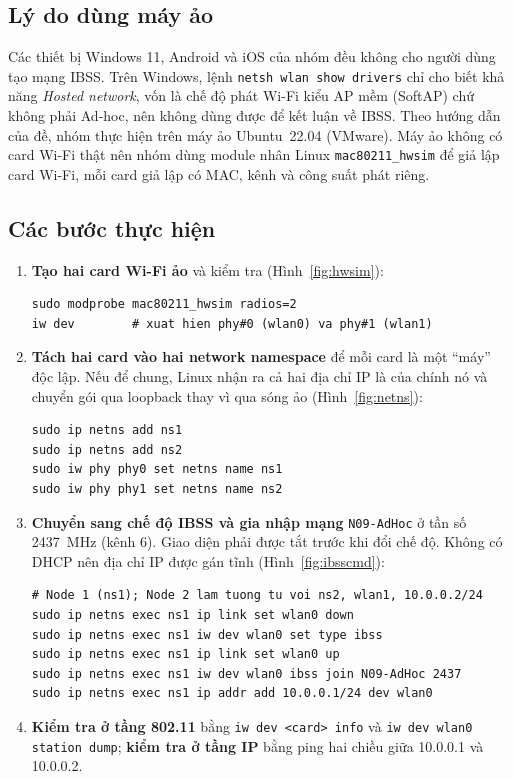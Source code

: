 \documentclass[12pt,a4paper]{article}
\numberwithin{figure}{section}
\numberwithin{table}{section}
\newcommand{\mono}[1]{\texttt{#1}}
\begin{document}
\subsection{Lý do dùng máy ảo}
Các thiết bị Windows 11, Android và iOS của nhóm đều không cho người dùng tạo
mạng IBSS. Trên Windows, lệnh \mono{netsh wlan show drivers} chỉ cho biết khả
năng \emph{Hosted network}, vốn là chế độ phát Wi-Fi kiểu AP mềm (SoftAP) chứ
không phải Ad-hoc, nên không dùng được để kết luận về IBSS. Theo hướng dẫn
của đề, nhóm thực hiện trên máy ảo Ubuntu~22.04 (VMware). Máy ảo không có card
Wi-Fi thật nên nhóm dùng module nhân Linux \mono{mac80211\_hwsim} để giả lập
card Wi-Fi, mỗi card giả lập có MAC, kênh và công suất phát riêng.

\subsection{Các bước thực hiện}
\begin{enumerate}
  \item \textbf{Tạo hai card Wi-Fi ảo} và kiểm tra (Hình~\ref{fig:hwsim}):
\begin{lstlisting}
sudo modprobe mac80211_hwsim radios=2
iw dev        # xuat hien phy#0 (wlan0) va phy#1 (wlan1)
\end{lstlisting}
  \item \textbf{Tách hai card vào hai network namespace} để mỗi card là một
    ``máy'' độc lập. Nếu để chung, Linux nhận ra cả hai địa chỉ IP là của
    chính nó và chuyển gói qua loopback thay vì qua sóng ảo
    (Hình~\ref{fig:netns}):
\begin{lstlisting}
sudo ip netns add ns1
sudo ip netns add ns2
sudo iw phy phy0 set netns name ns1
sudo iw phy phy1 set netns name ns2
\end{lstlisting}
  \item \textbf{Chuyển sang chế độ IBSS và gia nhập mạng} \mono{N09-AdHoc} ở
    tần số 2437~MHz (kênh 6). Giao diện phải được tắt trước khi đổi chế độ.
    Không có DHCP nên địa chỉ IP được gán tĩnh (Hình~\ref{fig:ibsscmd}):
\begin{lstlisting}
# Node 1 (ns1); Node 2 lam tuong tu voi ns2, wlan1, 10.0.0.2/24
sudo ip netns exec ns1 ip link set wlan0 down
sudo ip netns exec ns1 iw dev wlan0 set type ibss
sudo ip netns exec ns1 ip link set wlan0 up
sudo ip netns exec ns1 iw dev wlan0 ibss join N09-AdHoc 2437
sudo ip netns exec ns1 ip addr add 10.0.0.1/24 dev wlan0
\end{lstlisting}
  \item \textbf{Kiểm tra ở tầng 802.11} bằng \mono{iw dev <card> info} và
    \mono{iw dev wlan0 station dump}; \textbf{kiểm tra ở tầng IP} bằng ping hai
    chiều giữa 10.0.0.1 và 10.0.0.2.
\end{enumerate}
\end{document}
